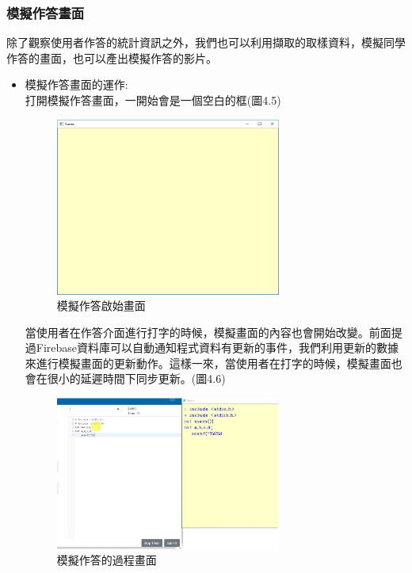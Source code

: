 \subsubsection{模擬作答畫面}
除了觀察使用者作答的統計資訊之外，我們也可以利用擷取的取樣資料，模擬同學作答的畫面，也可以產出模擬作答的影片。\\
\begin{itemize}
	\item 模擬作答畫面的運作:\\
	打開模擬作答畫面，一開始會是一個空白的框(圖4.5)
		\begin{figure}[H] 
		\centering 
		\includegraphics[width=0.7\textwidth]{video_space.png} 
		\caption{模擬作答啟始畫面} 
		\label{Fig.4.4.1} 
		\end{figure}
	當使用者在作答介面進行打字的時候，模擬畫面的內容也會開始改變。前面提過Firebase資料庫可以自動通知程式資料有更新的事件，我們利用更新的數據來進行模擬畫面的更新動作。這樣一來，當使用者在打字的時候，模擬畫面也會在很小的延遲時間下同步更新。(圖4.6)
	\begin{figure}[H] 
		\centering 
		\includegraphics[width=0.7\textwidth]{frame.png} 
		\caption{模擬作答的過程畫面} 
		\label{Fig.4.4.2} 
	\end{figure}


\end{itemize}
